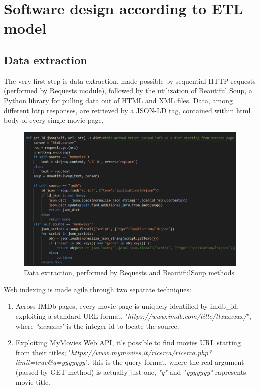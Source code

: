 \documentclass[11pt]{article}
\begin{document}
\newpage
\section{Software design according to ETL model}
\subsection{Data extraction}
The very first step is data extraction, made possible by sequential HTTP requests (performed by Requests module), followed by the utilization of Beautiful Soup, a Python library for pulling data out of HTML and XML files.
Data, among different http responses, are retrieved by a JSON-LD tag, contained within html body of every single movie page.
\begin{figure}[H]
    \centering
        \includegraphics[width=1.0\textwidth]{figures/codepic/f1.png}
    \caption{Data extraction, performed by Requests and BeautifulSoup methods}
    \label{fig:1}
\end{figure}
\noindent Web indexing is made agile through two separate techniques:
\begin{enumerate}
    \item Across IMDb pages, every movie page is uniquely identified by imdb\_id, exploiting a standard URL format, "\emph{https://www.imdb.com/title/ttxxxxxxx/}", where \emph{"xxxxxxx"} is the integer id to locate the source.
    \item Exploiting MyMovies Web API, it's possible to find movies URL starting from their titles; "\emph{https://www.mymovies.it/ricerca/ricerca.php?limit=true\&q=yyyyyyy}", this is the query format, where the real argument (passed by GET method) is actually just one, \emph{"q"} and \emph{"yyyyyyy"} rapresents movie title.
\end{enumerate}
\newpage\noindent
\end{document}
